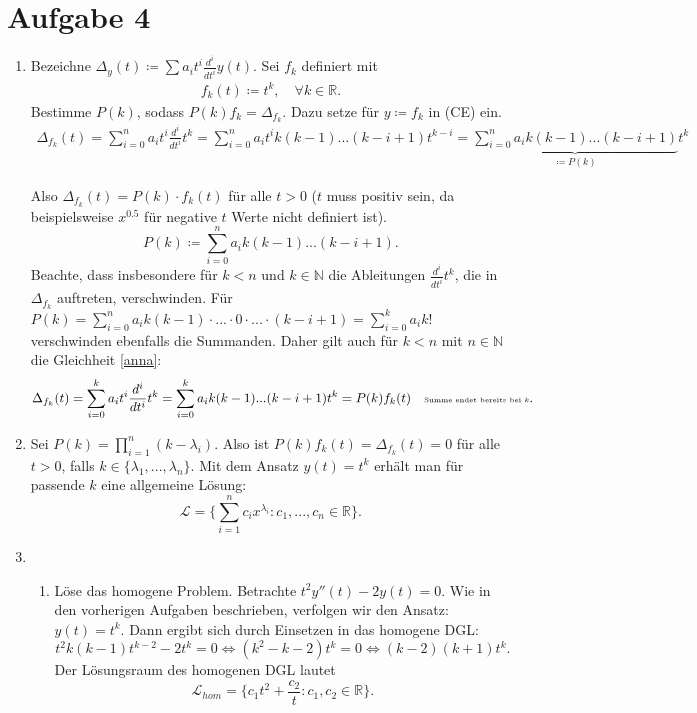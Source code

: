 \documentclass[a4paper,fontsize=8pt,DIV=1]{article}
\theoremstyle{plain}
\begin{document}
\section*{Aufgabe 4}
\begin{enumerate}[label=(\alph*)]
    \item Bezeichne $\Delta_y(t) \coloneqq \sum a_it^{i}\frac{d^{i}}{dt^{i}}y(t)$. Sei $f_k$ definiert mit
    \begin{align*}
    	f_k(t) \coloneqq t^k, \quad \forall k \in \mathbb R.
    \end{align*}
	 Bestimme $P(k)$, sodass $P(k)f_k = \Delta_{f_k}$. Dazu setze für $y \coloneqq f_k$ in (CE) ein.
    	\begin{align}\label{anna}
    		\Delta_{f_k}(t) = \sum^n_{i=0}a_it^{i}\frac{d^i}{dt^i}t^k = \sum^n_{i=0}a_it^{i}k(k-1)...(k-i+1)t^{k-i} =  \underbrace{\sum^n_{i=0}a_ik(k-1)...(k-i+1)}_{\coloneqq P(k)} t^k
    	\end{align}
    	
    	Also $	\Delta_{f_k}(t) = P(k) \cdot f_k(t)$ für alle $t>0$ ($t$ muss positiv sein, da beispielsweise $x^{0.5}$ für negative $t$ Werte nicht definiert ist). 
    	\[
    		P(k) \coloneqq \sum^n_{i=0}a_ik(k-1)...(k-i+1).
    	\]
    	Beachte, dass insbesondere für $k<n$ und $k \in \mathbb N$ die Ableitungen $\frac{d^{i}}{dt^{i}}t^k$, die in $\Delta_{f_k}$ auftreten, verschwinden. Für $P(k) = \sum^n_{i=0}a_ik(k-1) \cdot ... \cdot 0 \cdot ... \cdot (k-i+1) = \sum^k_{i=0}a_ik!$ verschwinden ebenfalls die Summanden. Daher gilt auch für $k<n$ mit $n \in \mathbb N$ die Gleichheit \eqref{anna}:
		\begin{align*}
			\Delta_{f_k}(t) = \sum^{k}_{i=0}a_it^{i}\frac{d^i}{dt^i}t^k  =  \sum^k_{i=0}a_ik(k-1)...(k-i+1) t^k = P(k)f_k(t) \quad \text{\tiny Summe endet bereits bei $k$}.
		\end{align*}
		
    \item Sei $P(k) = \prod_{i=1}^n (k-\lambda_i)$. Also ist $P(k)f_k(t) = \Delta_{f_k}(t) = 0$ für alle $t > 0$, falls $k \in \{ \lambda_1,...,\lambda_n\}$. Mit dem Ansatz $y(t) = t^k$ erhält man für passende $k$ eine allgemeine Lösung:
    \[
        \mathcal L = \{ \sum^n_{i=1} c_ix^{\lambda_i} : c_1,...,c_n \in \mathbb R \}.
    \]
    
    \item 
    \begin{enumerate}[label=\arabic*.)]
        \item Löse das homogene Problem. Betrachte $t^2y''(t) -2y(t) = 0$. Wie in den vorherigen Aufgaben beschrieben, verfolgen wir den Ansatz: $y(t) = t^k$. Dann ergibt sich durch Einsetzen in das homogene DGL:
        \[
            t^2k(k-1)t^{k-2} -2t^k = 0 \iff (k^2-k-2)t^k = 0 \iff (k-2)(k+1)t^k.
        \]
        Der Lösungsraum des homogenen DGL lautet
        \[
            \mathcal L_{hom} = \{ c_1t^2 + \frac{c_2}{t} : c_1, c_2 \in \mathbb R \}.
        \]
        

\end{enumerate}
\end{enumerate}
\end{document}
